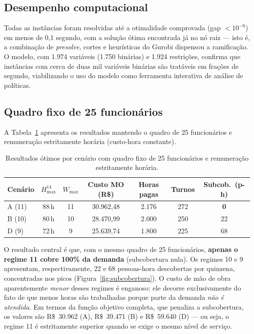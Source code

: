 \documentclass[12pt,a4paper]{article}
\begin{document}
\subsection{Desempenho computacional}

Todas as instâncias foram resolvidas até a otimalidade comprovada (gap
$< 10^{-6}$) em menos de 0,1 segundo, com a solução ótima encontrada já no nó
raiz --- isto é, a combinação de \emph{presolve}, cortes e heurísticas do
Gurobi dispensou a ramificação. O modelo, com 1.974 variáveis (1.750
binárias) e 1.924 restrições, confirma que instâncias com cerca de duas mil
variáveis binárias são tratáveis em frações de segundo, viabilizando o uso do
modelo como ferramenta interativa de análise de políticas.

\subsection{Quadro fixo de 25 funcionários}

A Tabela~\ref{tab:resultados} apresenta os resultados mantendo o quadro de 25
funcionários e remuneração estritamente horária (custo-hora constante).

\begin{table}[htb]
\centering
\caption{Resultados ótimos por cenário com quadro fixo de 25 funcionários e
remuneração estritamente horária.}
\label{tab:resultados}
\small
\begin{tabular}{lcccccc}
\toprule
Cenário & $H_{\max}^{14}$ & $W_{\max}$ & Custo MO (R\$) & Horas pagas &
Turnos & Subcob.\ (p-h)\\
\midrule
A (11\texttimes 3) & 88\,h & 11 & 30.962,48 & 2.176 & 272 & \textbf{0}\\
B (10\texttimes 4) & 80\,h & 10 & 28.470,99 & 2.000 & 250 & 22\\
D (9\texttimes 5)  & 72\,h & \phantom{0}9 & 25.639,74 & 1.800 & 225 & 68\\
\bottomrule
\end{tabular}
\end{table}

O resultado central é que, com o mesmo quadro de 25 funcionários,
\textbf{apenas o regime 11 cobre 100\% da demanda} (subcobertura
nula). Os regimes 10 e 9 apresentam, respectivamente,
22 e 68 pessoas-hora descobertas por quinzena, concentradas nos picos
(Figura~\ref{fig:subcobertura}). O custo de mão de obra aparentemente
\emph{menor} desses regimes é enganoso: ele decorre exclusivamente do fato de
que menos horas são trabalhadas porque parte da demanda \emph{não é atendida}.
Em termos da função objetivo completa, que penaliza a subcobertura, os valores
são R\$~30.962 (A), R\$~39.471 (B) e R\$~59.640 (D) --- ou seja, o regime
11 é estritamente superior quando se exige o mesmo nível de
serviço.
\end{document}
